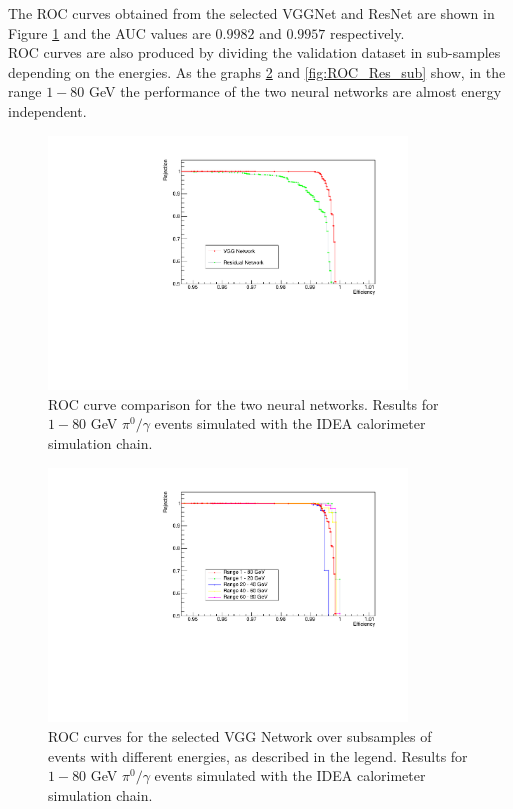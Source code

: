 The ROC curves obtained from the selected VGGNet and ResNet are shown in Figure \ref{fig:ROC} and the AUC values are $0.9982$ and $0.9957$ respectively.\\

ROC curves are also produced by dividing the validation dataset in sub-samples depending on the energies.
As the graphs \ref{fig:ROC_VGG_sub} and \ref{fig:ROC_Res_sub} show, in the range $1-80$ GeV the performance of the two neural networks are almost energy independent.

\begin{figure}
	\centering
	\includegraphics[width=0.85\textwidth]{IMG/Cap6/ROC_VGG_Res_zoom.pdf}
	\caption{ROC curve comparison for the two neural networks. Results for $1-80$ GeV $\pi^0/\gamma$ events simulated with the IDEA calorimeter simulation chain.}
	\label{fig:ROC}
\end{figure}

\begin{figure}
	\centering
	\includegraphics[width=0.85\textwidth]{IMG/Cap6/ROC_VGG_sub_zoom.pdf}
	\caption{ROC curves for the selected VGG Network over subsamples of events with different energies, as described in the legend. Results for $1-80$ GeV $\pi^0/\gamma$ events simulated with the IDEA calorimeter simulation chain.}
	\label{fig:ROC_VGG_sub}
\end{figure}

